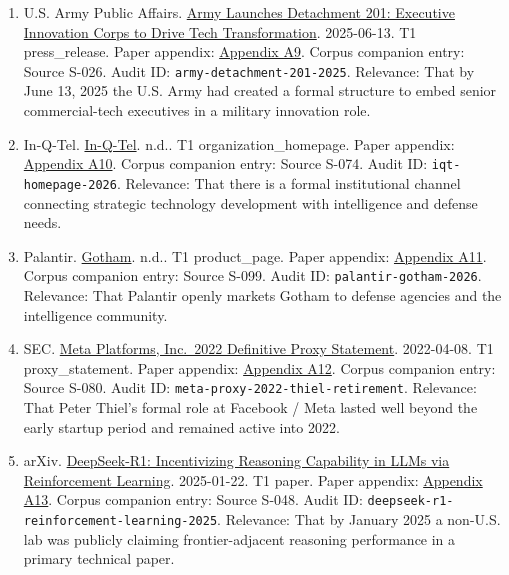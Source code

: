 \documentclass[
  american,
  11pt,
  letterpaper,
]{article}
\begin{document}
\begin{enumerate}
{  A8}. Corpus companion entry: Source S-098. Audit ID:
  \texttt{palantir-anthropic-aws-gov-partnership-2024}. Relevance: That
  by November 7, 2024 Anthropic model access for U.S. intelligence and
  defense agencies was being publicly distributed through a
  Palantir-plus-AWS stack.
\item
  U.S. Army Public Affairs.
  \href{https://www.army.mil/article/286317/army_launches_detachment_201_executive_innovation_corps_to_drive_tech_transformation}{Army
  Launches Detachment 201: Executive Innovation Corps to Drive Tech
  Transformation}. 2025-06-13. T1 press\_release. Paper appendix:
  \hyperref[ch-07-appendix-a9-army-launches-detachment-201-executive-innovation-corps-to-drive-tech-transformation]{Appendix
  A9}. Corpus companion entry: Source S-026. Audit ID:
  \texttt{army-detachment-201-2025}. Relevance: That by June 13, 2025
  the U.S. Army had created a formal structure to embed senior
  commercial-tech executives in a military innovation role.
\item
  In-Q-Tel. \href{https://www.iqt.org/}{In-Q-Tel}. n.d.. T1
  organization\_homepage. Paper appendix:
  \hyperref[ch-07-appendix-a10-in-q-tel]{Appendix A10}. Corpus companion
  entry: Source S-074. Audit ID: \texttt{iqt-homepage-2026}. Relevance:
  That there is a formal institutional channel connecting strategic
  technology development with intelligence and defense needs.
\item
  Palantir. \href{https://www.palantir.com/platforms/gotham/}{Gotham}.
  n.d.. T1 product\_page. Paper appendix:
  \hyperref[ch-07-appendix-a11-gotham]{Appendix A11}. Corpus companion
  entry: Source S-099. Audit ID: \texttt{palantir-gotham-2026}.
  Relevance: That Palantir openly markets Gotham to defense agencies and
  the intelligence community.
\item
  SEC.
  \href{https://www.sec.gov/Archives/edgar/data/1326801/000132680122000043/meta2022definitiveproxysta.htm}{Meta
  Platforms, Inc.~2022 Definitive Proxy Statement}. 2022-04-08. T1
  proxy\_statement. Paper appendix:
  \hyperref[ch-07-appendix-a12-meta-platforms-inc-2022-definitive-proxy-statement]{Appendix
  A12}. Corpus companion entry: Source S-080. Audit ID:
  \texttt{meta-proxy-2022-thiel-retirement}. Relevance: That Peter
  Thiel's formal role at Facebook / Meta lasted well beyond the early
  startup period and remained active into 2022.
\item
  arXiv. \href{https://arxiv.org/abs/2501.12948}{DeepSeek-R1:
  Incentivizing Reasoning Capability in LLMs via Reinforcement
  Learning}. 2025-01-22. T1 paper. Paper appendix:
  \hyperref[ch-07-appendix-a13-deepseek-r1-incentivizing-reasoning-capability-in-llms-via-reinforcement-learning]{Appendix
  A13}. Corpus companion entry: Source S-048. Audit ID:
  \texttt{deepseek-r1-reinforcement-learning-2025}. Relevance: That by
  January 2025 a non-U.S. lab was publicly claiming frontier-adjacent
  reasoning performance in a primary technical paper.
\end{enumerate}
\end{document}
